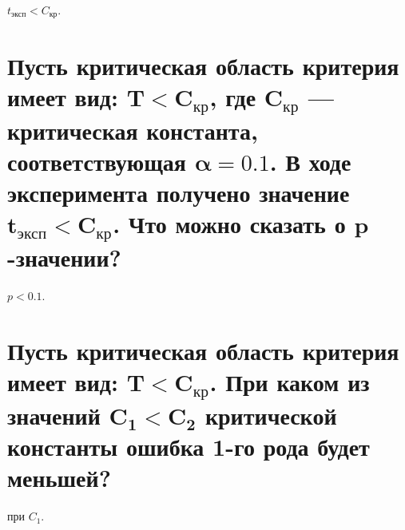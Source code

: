 \documentclass{article}
\begin{document}
$t_\text{эксп} < C_\text{кр}$.


\section{Пусть критическая область критерия имеет вид: $\bm{T < C_\text{кр}}$, где $\bm{C_\text{кр}}$ --- критическая константа, соответствующая $\bm{\alpha = 0.1}$. В ходе эксперимента получено значение $\bm{t_\text{эксп} < C_\text{кр}}$. Что можно сказать о $\bm{p}$-значении?}

$p < 0.1$.


\section{Пусть критическая область критерия имеет вид: $\bm{T < C_\text{кр}}$. При каком из значений $\bm{C_1 < C_2}$ критической константы ошибка 1-го рода будет меньшей?}

при $C_1$.

\end{document}
